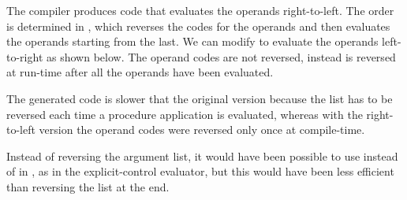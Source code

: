 \begin{exe}[5.36]
    The compiler produces code that evaluates the operands right-to-left. The 
    order is determined in , which reverses the codes for 
    the operands and then evaluates the operands starting from the last. We can 
    modify  to evaluate the operands left-to-right as 
    shown below. The operand codes are not reversed, instead  is 
    reversed at run-time after all the operands have been evaluated.

    The generated code is slower that the original version because the list has 
    to be reversed each time a procedure application is evaluated, whereas with 
    the right-to-left version the operand codes were reversed only once at 
    compile-time.

    Instead of reversing the argument list, it would have been possible to use 
     instead of  in , as 
    in the explicit-control evaluator, but this would have been less efficient 
    than reversing the list at the end.
\end{exe}


